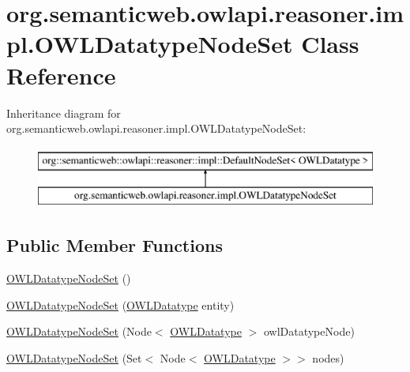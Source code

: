 \hypertarget{classorg_1_1semanticweb_1_1owlapi_1_1reasoner_1_1impl_1_1_o_w_l_datatype_node_set}{\section{org.\-semanticweb.\-owlapi.\-reasoner.\-impl.\-O\-W\-L\-Datatype\-Node\-Set Class Reference}
\label{classorg_1_1semanticweb_1_1owlapi_1_1reasoner_1_1impl_1_1_o_w_l_datatype_node_set}
}
Inheritance diagram for org.\-semanticweb.\-owlapi.\-reasoner.\-impl.\-O\-W\-L\-Datatype\-Node\-Set\-:\begin{figure}[H]
\begin{center}
\leavevmode
\includegraphics[height=2.000000cm]{classorg_1_1semanticweb_1_1owlapi_1_1reasoner_1_1impl_1_1_o_w_l_datatype_node_set}
\end{center}
\end{figure}
\subsection*{Public Member Functions}
\begin{DoxyCompactItemize}
\item 
\hyperlink{classorg_1_1semanticweb_1_1owlapi_1_1reasoner_1_1impl_1_1_o_w_l_datatype_node_set_ac6846223a4d172ed5dd88f32a24428c5}{O\-W\-L\-Datatype\-Node\-Set} ()
\item 
\hyperlink{classorg_1_1semanticweb_1_1owlapi_1_1reasoner_1_1impl_1_1_o_w_l_datatype_node_set_a6d3e7f66d4bccc41fba97474d73f1644}{O\-W\-L\-Datatype\-Node\-Set} (\hyperlink{interfaceorg_1_1semanticweb_1_1owlapi_1_1model_1_1_o_w_l_datatype}{O\-W\-L\-Datatype} entity)
\item 
\hyperlink{classorg_1_1semanticweb_1_1owlapi_1_1reasoner_1_1impl_1_1_o_w_l_datatype_node_set_a7ecc64bf2eef5dbfe032f180fc5cd077}{O\-W\-L\-Datatype\-Node\-Set} (Node$<$ \hyperlink{interfaceorg_1_1semanticweb_1_1owlapi_1_1model_1_1_o_w_l_datatype}{O\-W\-L\-Datatype} $>$ owl\-Datatype\-Node)
\item 
\hyperlink{classorg_1_1semanticweb_1_1owlapi_1_1reasoner_1_1impl_1_1_o_w_l_datatype_node_set_a78add3cd63f8253f4964922eb29ef5f5}{O\-W\-L\-Datatype\-Node\-Set} (Set$<$ Node$<$ \hyperlink{interfaceorg_1_1semanticweb_1_1owlapi_1_1model_1_1_o_w_l_datatype}{O\-W\-L\-Datatype} $>$$>$ nodes)
\end{DoxyCompactItemize}
